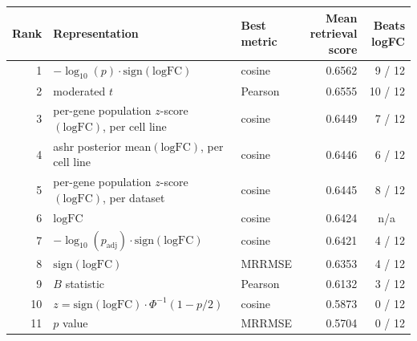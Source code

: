 \begin{table}[t]
\label{tab:cross_dataset_retrieval_representation_ranking_core}
\centering
\footnotesize
\setlength{\tabcolsep}{6pt}
\begin{tabular}{rllrr}
\toprule
Rank & Representation & Best metric & Mean retrieval score & Beats logFC \\
\midrule
1 & $-\log_{10}(p)\cdot\mathrm{sign}(\mathrm{logFC})$ & cosine & 0.6562 & 9 / 12 \\
2 & moderated $t$ & Pearson & 0.6555 & 10 / 12 \\
3 & per-gene population $z$-score$(\mathrm{logFC})$, per cell line & cosine & 0.6449 & 7 / 12 \\
4 & ashr posterior mean$(\mathrm{logFC})$, per cell line & cosine & 0.6446 & 6 / 12 \\
5 & per-gene population $z$-score$(\mathrm{logFC})$, per dataset & cosine & 0.6445 & 8 / 12 \\
6 & $\mathrm{logFC}$ & cosine & 0.6424 & \multicolumn{1}{c}{n/a} \\
7 & $-\log_{10}(p_{\mathrm{adj}})\cdot\mathrm{sign}(\mathrm{logFC})$ & cosine & 0.6421 & 4 / 12 \\
8 & $\mathrm{sign}(\mathrm{logFC})$ & MRRMSE & 0.6353 & 4 / 12 \\
9 & $B$ statistic & Pearson & 0.6132 & 3 / 12 \\
10 & $z=\mathrm{sign}(\mathrm{logFC})\cdot\Phi^{-1}(1-p/2)$ & cosine & 0.5873 & 0 / 12 \\
11 & $p$ value & MRRMSE & 0.5704 & 0 / 12 \\
\bottomrule
\end{tabular}
\end{table}

